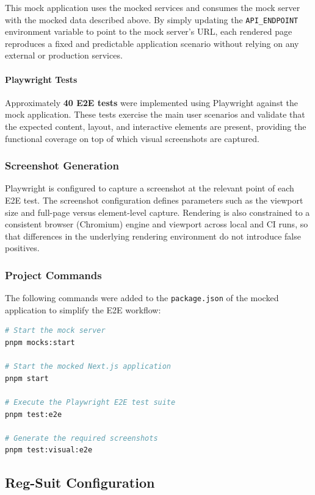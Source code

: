 This mock application uses the mocked services and consumes the mock server with the mocked data described above. By simply updating the \texttt{API\_ENDPOINT} environment variable to point to the mock server's URL, each rendered page reproduces a fixed and predictable application scenario without relying on any external or production services.
 
\paragraph{Playwright Tests} Approximately \textbf{40 \ac{E2E} tests} were implemented using Playwright against the mock application. These tests exercise the main user scenarios and validate that the expected content, layout, and interactive elements are present, providing the functional coverage on top of which visual screenshots are captured.

\subsubsection{Screenshot Generation}

Playwright is configured to capture a screenshot at the relevant point of each \ac{E2E} test. The screenshot configuration defines parameters such as the viewport size and full-page versus element-level capture. Rendering is also constrained to a consistent browser (Chromium) engine and viewport across local and \ac{CI} runs, so that differences in the underlying rendering environment do not introduce false positives.

\subsubsection{Project Commands}

The following commands were added to the \texttt{package.json} of the mocked application to simplify the \ac{E2E} workflow:

\begin{lstlisting}[language=bash]
# Start the mock server
pnpm mocks:start

# Start the mocked Next.js application
pnpm start

# Execute the Playwright E2E test suite
pnpm test:e2e

# Generate the required screenshots
pnpm test:visual:e2e
\end{lstlisting}

\subsection{Reg-Suit Configuration}

